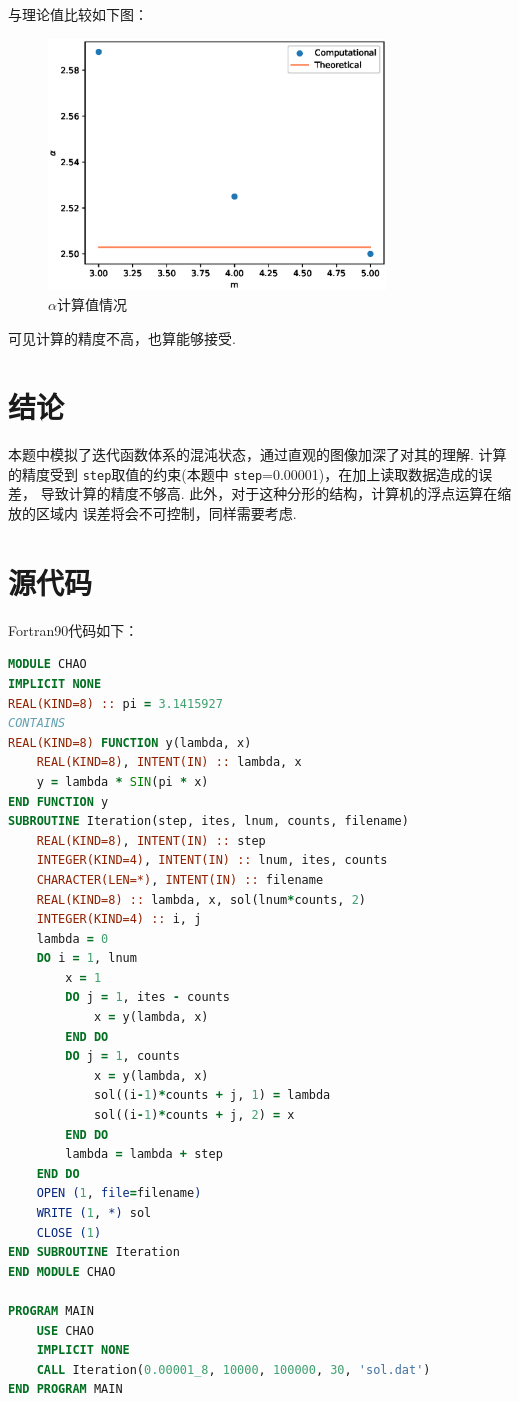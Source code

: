 \documentclass[12pt,a4paper,utf8]{ctexart}
\begin{document}
与理论值比较如下图：
\begin{figure}[!h]
    \centering
    \includegraphics[width=0.8\textwidth]{err2.eps}
    \caption{$\alpha$计算值情况}
\end{figure}

可见计算的精度不高，也算能够接受.
\section{结论}

本题中模拟了迭代函数体系的混沌状态，通过直观的图像加深了对其的理解.
计算的精度受到 \texttt{step}取值的约束(本题中 \texttt{step}=0.00001)，在加上读取数据造成的误差，
导致计算的精度不够高. 此外，对于这种分形的结构，计算机的浮点运算在缩放的区域内
误差将会不可控制，同样需要考虑.

\section{源代码}

Fortran90代码如下：
\begin{framed}
\begin{lstlisting}[language=Fortran]
MODULE CHAO
IMPLICIT NONE
REAL(KIND=8) :: pi = 3.1415927
CONTAINS
REAL(KIND=8) FUNCTION y(lambda, x)
    REAL(KIND=8), INTENT(IN) :: lambda, x
    y = lambda * SIN(pi * x)
END FUNCTION y
SUBROUTINE Iteration(step, ites, lnum, counts, filename)
    REAL(KIND=8), INTENT(IN) :: step
    INTEGER(KIND=4), INTENT(IN) :: lnum, ites, counts
    CHARACTER(LEN=*), INTENT(IN) :: filename
    REAL(KIND=8) :: lambda, x, sol(lnum*counts, 2)
    INTEGER(KIND=4) :: i, j
    lambda = 0
    DO i = 1, lnum
        x = 1
        DO j = 1, ites - counts
            x = y(lambda, x)
        END DO
        DO j = 1, counts
            x = y(lambda, x)
            sol((i-1)*counts + j, 1) = lambda
            sol((i-1)*counts + j, 2) = x
        END DO
        lambda = lambda + step
    END DO
    OPEN (1, file=filename)
    WRITE (1, *) sol
    CLOSE (1)
END SUBROUTINE Iteration
END MODULE CHAO

PROGRAM MAIN
    USE CHAO    
    IMPLICIT NONE    
    CALL Iteration(0.00001_8, 10000, 100000, 30, 'sol.dat')
END PROGRAM MAIN
\end{lstlisting}
\end{framed}
\end{document}
